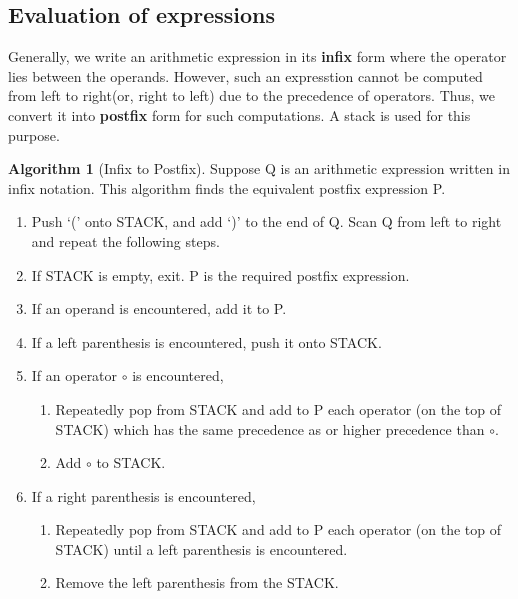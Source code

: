\documentclass[10pt, a4paper]{extarticle}
\theoremstyle{definition}
\newtheorem{alg}{Algorithm}
\begin{document}
\subsection{Evaluation of expressions}
Generally, we write an arithmetic expression in its \textbf{infix} form where the operator lies between the operands. However, such an expresstion cannot be computed from left to right(or, right to left) due to the precedence of operators. Thus, we convert it into \textbf{postfix} form for such computations. A stack is used for this purpose.
\begin{alg}[Infix to Postfix]
	Suppose Q is an arithmetic expression written in infix notation. This algorithm finds the equivalent postfix expression P.
	\begin{enumerate}
		\item Push `(' onto STACK, and add `)' to the end of Q. Scan Q from left to right and repeat the following steps.
		\item If STACK is empty, exit. P is the required postfix expression.
		\item If an operand is encountered, add it to P.
		\item  If a left parenthesis is encountered, push it onto STACK.
		\item  If an operator $\circ$ is encountered,
		      \begin{enumerate}
			      \item Repeatedly pop from STACK and add to P each operator (on the top of STACK) which has the same precedence as or higher precedence than $\circ$.
			      \item Add $\circ$ to STACK.
		      \end{enumerate}

		\item If a right parenthesis is encountered,
		      \begin{enumerate}
			      \item Repeatedly pop from STACK and add to P each operator (on the top of STACK) until a left parenthesis is encountered.
			      \item Remove the left parenthesis from the STACK.
		      \end{enumerate}
	\end{enumerate}
\end{alg}
\end{document}
